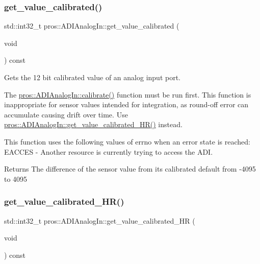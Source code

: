 \subsubsection{\texorpdfstring{get\_value\_calibrated()}{get\_value\_calibrated()}}
{\footnotesize\ttfamily std\+::int32\+\_\+t pros\+::\+A\+D\+I\+Analog\+In\+::get\+\_\+value\+\_\+calibrated (\begin{DoxyParamCaption}\item[{void}]{ }\end{DoxyParamCaption}) const}



Gets the 12 bit calibrated value of an analog input port. 

The \mbox{\hyperlink{classpros_1_1ADIAnalogIn_ac8dd1e625cbcec4951d20be0c0fa2d3c}{pros\+::\+A\+D\+I\+Analog\+In\+::calibrate()}} function must be run first. This function is inappropriate for sensor values intended for integration, as round-\/off error can accumulate causing drift over time. Use \mbox{\hyperlink{classpros_1_1ADIAnalogIn_a65bfed175ed1b0efce4566e78e7f9473}{pros\+::\+A\+D\+I\+Analog\+In\+::get\+\_\+value\+\_\+calibrated\+\_\+\+H\+R()}} instead.

This function uses the following values of errno when an error state is reached\+: E\+A\+C\+C\+ES -\/ Another resource is currently trying to access the A\+DI.

\begin{DoxyReturn}{Returns}
The difference of the sensor value from its calibrated default from -\/4095 to 4095 
\end{DoxyReturn}
\mbox{\label{classpros_1_1ADIAnalogIn_a65bfed175ed1b0efce4566e78e7f9473}} 
\subsubsection{\texorpdfstring{get\_value\_calibrated\_HR()}{get\_value\_calibrated\_HR()}}
{\footnotesize\ttfamily std\+::int32\+\_\+t pros\+::\+A\+D\+I\+Analog\+In\+::get\+\_\+value\+\_\+calibrated\+\_\+\+HR (\begin{DoxyParamCaption}\item[{void}]{ }\end{DoxyParamCaption}) const}



